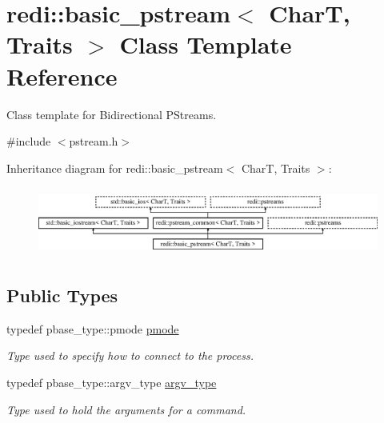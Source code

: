 \hypertarget{classredi_1_1basic__pstream}{}\section{redi\+:\+:basic\+\_\+pstream$<$ CharT, Traits $>$ Class Template Reference}
\label{classredi_1_1basic__pstream}


Class template for Bidirectional P\+Streams.  




{\ttfamily \#include $<$pstream.\+h$>$}

Inheritance diagram for redi\+:\+:basic\+\_\+pstream$<$ CharT, Traits $>$\+:\begin{figure}[H]
\begin{center}
\leavevmode
\includegraphics[height=2.295082cm]{classredi_1_1basic__pstream}
\end{center}
\end{figure}
\subsection*{Public Types}
\begin{DoxyCompactItemize}
\item 
\mbox{\label{classredi_1_1basic__pstream_afe345298729108110db56a3c3c18b4d2}} 
typedef pbase\+\_\+type\+::pmode \mbox{\hyperlink{classredi_1_1basic__pstream_afe345298729108110db56a3c3c18b4d2}{pmode}}
\begin{DoxyCompactList}\small\item\em Type used to specify how to connect to the process. \end{DoxyCompactList}\item 
\mbox{\label{classredi_1_1basic__pstream_a9e421db5c7431ec36b830ffaa9dabe04}} 
typedef pbase\+\_\+type\+::argv\+\_\+type \mbox{\hyperlink{classredi_1_1basic__pstream_a9e421db5c7431ec36b830ffaa9dabe04}{argv\+\_\+type}}
\begin{DoxyCompactList}\small\item\em Type used to hold the arguments for a command. \end{DoxyCompactList}\end{DoxyCompactItemize}
